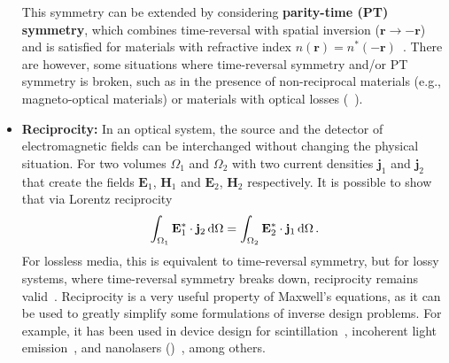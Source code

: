 \begin{itemize}
              This
              symmetry can be extended by
              considering \textbf{parity-time (PT) symmetry}, which combines time-reversal
              with spatial inversion ($\mathbf{r}\to-\mathbf{r}$) and is satisfied for
              materials with refractive index $n(\mathbf{r}) = n^*(-\mathbf{r})$~\cite{pt}. There
              are however, some situations where time-reversal symmetry and/or PT symmetry is
              broken,
              such as in the presence of
              non-reciprocal materials (e.g., magneto-optical materials) or materials with
              optical losses (~\cite{ownpub0}).

              \item \textbf{Reciprocity:} In an optical system, the source and the
              detector of electromagnetic fields can be interchanged without changing the
              physical situation. For two volumes $\Omega_1$ and
                           $\Omega_2$
              with two current densities $\mathbf{j}_1$ and $\mathbf{j}_2$ that create
              the fields $\mathbf{E}_1$, $\mathbf{H}_1$ and $\mathbf{E}_2$, $\mathbf{H}_2$
              respectively. It is possible to show that via Lorentz reciprocity~\cite{novotny}
                           \begin{equation}\label{eq:reciprocity}
                               \int_{\Omega_1} \mathbf{E}_1^* \cdot \mathbf{j}_2 \mathop{}\!\text{d} \Omega = \int_{\Omega_2}
              \mathbf{E}_2^* \cdot \mathbf{j}_1 \mathop{}\!\text{d} \Omega\,.
                           \end{equation}
              For lossless media, this is equivalent to time-reversal symmetry, but for
              lossy systems, where time-reversal symmetry breaks down, reciprocity remains valid~\cite{Carminati:98}. Reciprocity
              is a very useful property of Maxwell's equations, as it can be used to
              greatly simplify some formulations of inverse design problems. For example, it has been used in device design for
              scintillation~\cite{Roques_Carmes_2022}, incoherent light emission~\cite{LED_opt, Yao_2022}, and nanolasers ()~\cite{ownpub4}, among others.
    \end{itemize}


